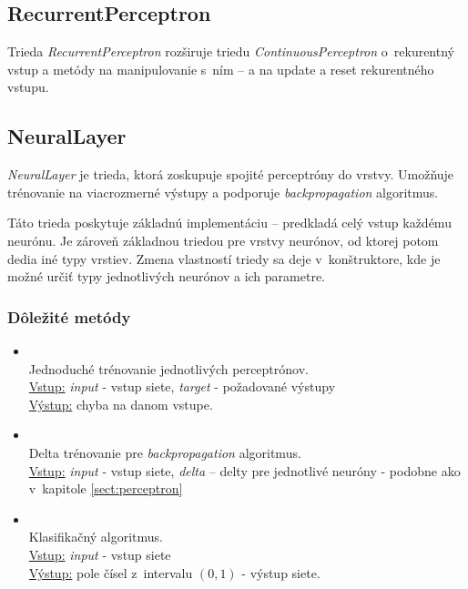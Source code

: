 \subsection{RecurrentPerceptron}
Trieda \textit{RecurrentPerceptron} rozširuje triedu \textit{ContinuousPerceptron} o~rekurentný vstup a metódy na manipulovanie s~ním --  a  na update a reset rekurentného vstupu.

\subsection{NeuralLayer}
\textit{NeuralLayer} je trieda, ktorá zoskupuje spojité perceptróny do vrstvy. Umožňuje trénovanie na viacrozmerné výstupy a podporuje \textit{backpropagation} algoritmus. 

Táto trieda poskytuje základnú implementáciu -- predkladá celý vstup každému neurónu. Je zároveň základnou triedou pre vrstvy neurónov, od ktorej potom dedia iné typy vrstiev. Zmena vlastností triedy sa deje v~konštruktore, kde je možné určiť typy jednotlivých neurónov a ich parametre.

\subsubsection{Dôležité metódy}
\begin{itemize}
\item {}
\\Jednoduché trénovanie jednotlivých perceptrónov.
\\ \underline{Vstup:} \textit{input} - vstup siete, \textit{target} - požadované výstupy 
\\ \underline{Výstup:} chyba na danom vstupe.
\item {}
\\Delta trénovanie pre \textit{backpropagation} algoritmus.
\\ \underline{Vstup:} \textit{input} - vstup siete, \textit{delta} -- delty pre jednotlivé neuróny - podobne ako v~kapitole \ref{sect:perceptron}
\item {}
\\ Klasifikačný algoritmus.
\\ \underline{Vstup:} \textit{input} - vstup siete
\\ \underline{Výstup:} pole čísel z~intervalu $(0,1)$ - výstup siete.
\end{itemize}

